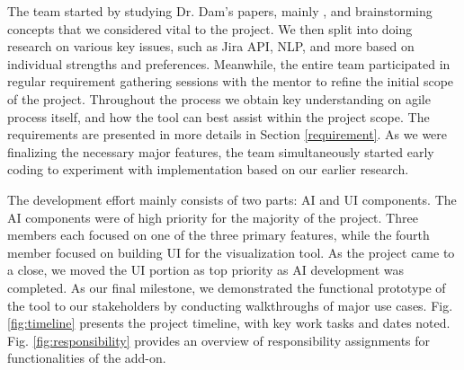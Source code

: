 The team started by studying Dr. Dam's papers, mainly \cite{dam1}, and brainstorming concepts that we considered vital to the project. We then split into doing research on various key issues, such as Jira API, NLP, and more based on individual strengths and preferences. Meanwhile, the entire team participated in regular requirement gathering sessions with the mentor to refine the initial scope of the project. Throughout the process we obtain key understanding on agile process itself, and how the tool can best assist within the project scope. The requirements are presented in more details in Section \ref{requirement}. As we were finalizing the necessary major features, the team simultaneously started early coding to experiment with implementation based on our earlier research. 

The development effort mainly consists of two parts: AI and UI components.  The AI components were of high priority for the majority of the project. Three members each focused on one of the three primary features, while the fourth member focused on building UI for the visualization tool. As the project came to a close, we moved the UI portion as top priority as AI development was completed. As our final milestone, we demonstrated the functional prototype of the tool to our stakeholders by conducting walkthroughs of major use cases. Fig. \ref{fig:timeline} presents the project timeline, with key work tasks and dates noted. Fig. \ref{fig:responsibility} provides an overview of responsibility assignments for functionalities of the add-on.

